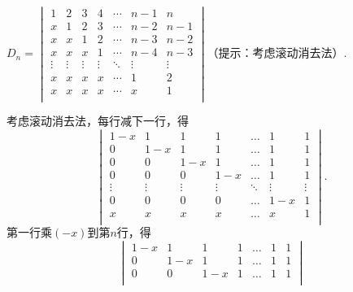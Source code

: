 \begin{exercise}
\begin{exgroup}
        \item $ D_n=\begin{vmatrix}
                1      & 2      & 3      & 4      & \cdots & n-1    & n      \\
                x      & 1      & 2      & 3      & \cdots & n-2    & n-1    \\
                x      & x      & 1      & 2      & \cdots & n-3    & n-2    \\
                x      & x      & x      & 1      & \cdots & n-4    & n-3    \\
                \vdots & \vdots & \vdots & \vdots & \ddots & \vdots & \vdots \\
                x      & x      & x      & x      & \cdots & 1      & 2      \\
                x      & x      & x      & x      & \cdots & x      & 1      \\
            \end{vmatrix}$（提示：考虑滚动消去法）.
        \begin{answer}
            考虑滚动消去法，每行减下一行，得
            \[ \begin{vmatrix}
                    1-x    & 1      & 1      & 1      & \ldots & 1      & 1      \\
                    0      & 1-x    & 1      & 1      & \ldots & 1      & 1      \\
                    0      & 0      & 1-x    & 1      & \ldots & 1      & 1      \\
                    0      & 0      & 0      & 1-x    & \ldots & 1      & 1      \\
                    \vdots & \vdots & \vdots & \vdots & \ddots & \vdots & \vdots \\
                    0      & 0      & 0      & 0      & \ldots & 1-x    & 1      \\
                    x      & x      & x      & x      & \ldots & x      & 1      \\
                \end{vmatrix}. \]
            第一行乘$(-x)$到第$n$行，得
            \[\begin{vmatrix}
                    1-x    & 1      & 1      & 1      & \ldots & 1      & 1      \\
                    0      & 1-x    & 1      & 1      & \ldots & 1      & 1      \\
                    0      & 0      & 1-x    & 1      & \ldots & 1      & 1      \\

\end{vmatrix}\]
\end{answer}
\end{exgroup}
\end{exercise}

